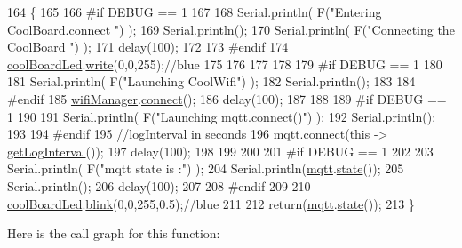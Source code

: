 \begin{DoxyCode}
164 \{
165 
166 \textcolor{preprocessor}{#if DEBUG == 1  }
167 
168     Serial.println( F(\textcolor{stringliteral}{"Entering CoolBoard.connect "}) );
169     Serial.println();
170     Serial.println( F(\textcolor{stringliteral}{"Connecting the CoolBoard  "}) );
171     delay(100);
172 
173 \textcolor{preprocessor}{#endif}
174     \hyperlink{classCoolBoard_a1b1d3c684a5baa56b08486e192fd8e97}{coolBoardLed}.\hyperlink{classCoolBoardLed_a30fadd4cbec17ceea428bf7a32207e87}{write}(0,0,255);\textcolor{comment}{//blue}
175 
176     
177             
178     
179 \textcolor{preprocessor}{#if DEBUG == 1      }
180 
181     Serial.println( F(\textcolor{stringliteral}{"Launching CoolWifi"}) );
182     Serial.println();
183 
184 \textcolor{preprocessor}{#endif}
185     \hyperlink{classCoolBoard_acd88e6003606b47479ebba81e4aceeca}{wifiManager}.\hyperlink{classCoolWifi_ad060353050f40d032a2dbf9e54a768bf}{connect}();
186     delay(100);
187     
188     
189 \textcolor{preprocessor}{#if DEBUG == 1  }
190 
191     Serial.println( F(\textcolor{stringliteral}{"Launching mqtt.connect()"}) );
192     Serial.println();
193 
194 \textcolor{preprocessor}{#endif  }
195     \textcolor{comment}{//logInterval in seconds}
196     \hyperlink{classCoolBoard_a2399f44d7c23c1149a335cb3b46d90f1}{mqtt}.\hyperlink{classCoolMQTT_a50075d0ab23a327ab897fd6adad20eda}{connect}(\textcolor{keyword}{this} -> \hyperlink{classCoolBoard_a7508e029f2ee17bb747ffab599285e0d}{getLogInterval}());
197     delay(100);
198         
199     
200     
201 \textcolor{preprocessor}{#if DEBUG == 1}
202 
203     Serial.println( F(\textcolor{stringliteral}{"mqtt state is :"}) );
204     Serial.println(\hyperlink{classCoolBoard_a2399f44d7c23c1149a335cb3b46d90f1}{mqtt}.\hyperlink{classCoolMQTT_a5d003307eff78efbd585e42b43b72b6d}{state}());
205     Serial.println();
206     delay(100);
207 
208 \textcolor{preprocessor}{#endif}
209 
210     \hyperlink{classCoolBoard_a1b1d3c684a5baa56b08486e192fd8e97}{coolBoardLed}.\hyperlink{classCoolBoardLed_a96e1ea13003eee34c9dbcef340404426}{blink}(0,0,255,0.5);\textcolor{comment}{//blue}
211 
212     \textcolor{keywordflow}{return}(\hyperlink{classCoolBoard_a2399f44d7c23c1149a335cb3b46d90f1}{mqtt}.\hyperlink{classCoolMQTT_a5d003307eff78efbd585e42b43b72b6d}{state}());
213 \}
\end{DoxyCode}
Here is the call graph for this function\+:
\nopagebreak
